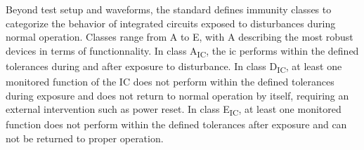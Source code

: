 Beyond test setup and waveforms, the standard defines immunity classes to categorize the behavior of integrated circuits exposed to disturbances during normal operation.
Classes range from A to E, with A describing the most robust devices in terms of functionnality.
In class A\textsubscript{IC}, the \gls{ic} performs within the defined tolerances during and after exposure to disturbance.
In class D\textsubscript{IC}, at least one monitored function of the IC does not perform within the defined tolerances during exposure and does not return to normal operation by itself, requiring an external intervention such as power reset.
In class E\textsubscript{IC}, at least one monitored function does not perform within the defined tolerances after exposure and can not be returned to proper operation.
